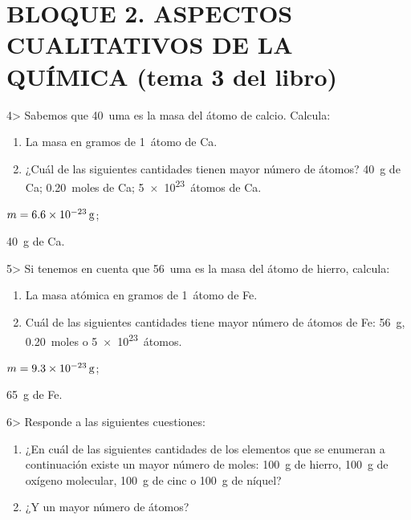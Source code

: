 \documentclass[twocolumn]{article}
\begin{document}
\section{BLOQUE 2. ASPECTOS CUALITATIVOS DE LA QUÍMICA (tema 3 del libro)}


\begin{exercise}
4> Sabemos que \SI{40}{uma} es la masa del átomo de calcio. Calcula:
  \begin{enumerate}
    \item La masa en gramos de \SI{1}{átomo} de Ca.
    \item ¿Cuál de las siguientes cantidades tienen mayor número de átomos? \SI{40}{g} de Ca; \SI{0,20}{moles} de Ca; \SI{5e23}{átomos} de Ca.
  \end{enumerate}
\end{exercise}

\begin{solution}
  \begin{enumerate*}
    \item $m = \SI{6,6E-23}{\gram}$;
    \item \SI{40}{\gram} de Ca.
  \end{enumerate*}
\end{solution}

\begin{exercise}
  5> Si tenemos en cuenta que \SI{56}{uma} es la masa del átomo de hierro, calcula:
  \begin{enumerate}
    \item La masa atómica en gramos de \SI{1}{átomo} de Fe.
    \item Cuál de las siguientes cantidades tiene mayor número de átomos de Fe: \SI{56}{\gram}, \SI{0,20}{moles} o \SI{5e23}{átomos}.
  \end{enumerate}
\end{exercise}

\begin{solution}
  \begin{enumerate*}
    \item $m = \SI{9,3E-23}{\gram}$;
    \item \SI{65}{\gram} de Fe.
  \end{enumerate*}
\end{solution}

\begin{exercise}
  6> Responde a las siguientes cuestiones:
  \begin{enumerate}
    \item ¿En cuál de las siguientes cantidades de los elementos que se enumeran a continuación existe un mayor número de moles: \SI{100}{\gram} de hierro, \SI{100}{\gram} de oxígeno molecular, \SI{100}{\gram} de cinc o \SI{100}{\gram} de níquel?
    \item ¿Y un mayor número de átomos?
  \end{enumerate}
\end{exercise}
\end{document}
